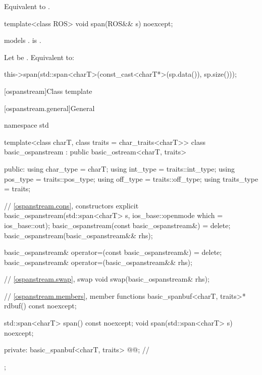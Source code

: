 \begin{itemdescr}
\pnum
\effects
Equivalent to .
\end{itemdescr}

\begin{itemdecl}
template<class ROS> void span(ROS&& s) noexcept;
\end{itemdecl}

\begin{itemdescr}
\pnum
\constraints
{} models .
is .

\pnum
\effects
Let  be .
Equivalent to:
\begin{codeblock}
this->span(std::span<charT>(const_cast<charT*>(sp.data()), sp.size()));
\end{codeblock}
\end{itemdescr}

[ospanstream]{Class template }

[ospanstream.general]{General}

%
\begin{codeblock}
namespace std {
  template<class charT, class traits = char_traits<charT>>
  class basic_ospanstream
    : public basic_ostream<charT, traits> {
  public:
    using char_type   = charT;
    using int_type    = traits::int_type;
    using pos_type    = traits::pos_type;
    using off_type    = traits::off_type;
    using traits_type = traits;

    // \ref{ospanstream.cons}, constructors
    explicit basic_ospanstream(std::span<charT> s,
                               ios_base::openmode which = ios_base::out);
    basic_ospanstream(const basic_ospanstream&) = delete;
    basic_ospanstream(basic_ospanstream&& rhs);

    basic_ospanstream& operator=(const basic_ospanstream&) = delete;
    basic_ospanstream& operator=(basic_ospanstream&& rhs);

    // \ref{ospanstream.swap}, swap
    void swap(basic_ospanstream& rhs);

    // \ref{ospanstream.members}, member functions
    basic_spanbuf<charT, traits>* rdbuf() const noexcept;

    std::span<charT> span() const noexcept;
    void span(std::span<charT> s) noexcept;

  private:
    basic_spanbuf<charT, traits> @@;    // \expos
  };
}
\end{codeblock}

